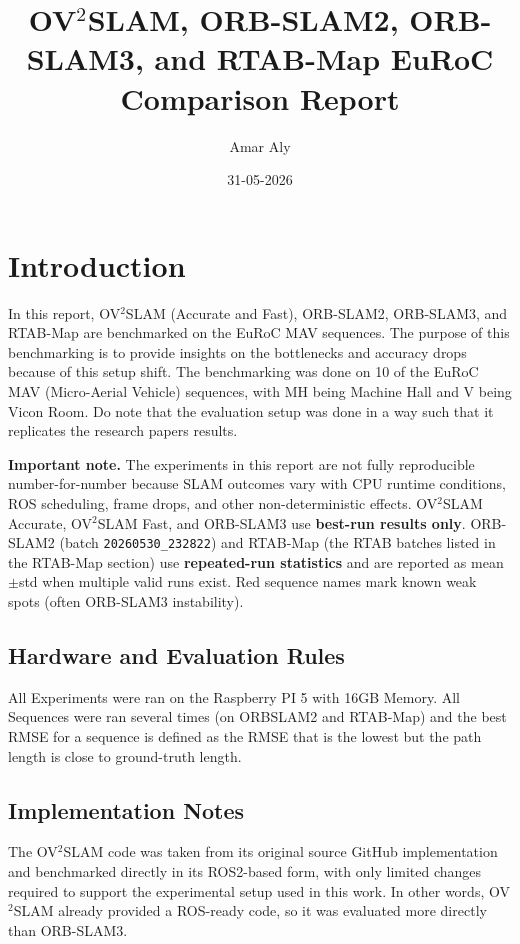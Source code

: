 \documentclass[11pt]{article}
\title{OV$^{2}$SLAM, ORB-SLAM2, ORB-SLAM3, and RTAB-Map EuRoC Comparison Report}
\author{Amar Aly}
\date{31-05-2026}
\begin{document}
\maketitle


\tableofcontents

\section{Introduction}

In this report, OV$^{2}$SLAM (Accurate and Fast), ORB-SLAM2, ORB-SLAM3, and RTAB-Map are benchmarked on the EuRoC MAV sequences. The purpose of this benchmarking is to provide insights on the bottlenecks and accuracy drops because of this setup shift. The benchmarking was done on 10 of the EuRoC MAV (Micro-Aerial Vehicle) sequences, with MH being Machine Hall and V being Vicon Room. Do note that the evaluation setup was done in a way such that it replicates the research papers results.

\textbf{Important note.} The experiments in this report are not fully reproducible number-for-number because SLAM outcomes vary with CPU runtime conditions, ROS scheduling, frame drops, and other non-deterministic effects. OV$^{2}$SLAM Accurate, OV$^{2}$SLAM Fast, and ORB-SLAM3 use \textbf{best-run results only}. ORB-SLAM2 (batch \texttt{20260530\_232822}) and RTAB-Map (the RTAB batches listed in the RTAB-Map section) use \textbf{repeated-run statistics} and are reported as mean$\pm$std when multiple valid runs exist. Red sequence names mark known weak spots (often ORB-SLAM3 instability).

\subsection{Hardware and Evaluation Rules}
All Experiments were ran on the Raspberry PI 5 with 16GB Memory. All Sequences were ran several times (on ORBSLAM2 and RTAB-Map) and the best RMSE for a sequence is defined as the RMSE that is the lowest but the path length is close to ground-truth length. 

\subsection{Implementation Notes}

The OV$^{2}$SLAM code was taken from its original source GitHub implementation and benchmarked directly in its ROS2-based form, with only limited changes required to support the experimental setup used in this work. In other words, OV$^{2}$SLAM already provided a ROS-ready code, so it was evaluated more directly than ORB-SLAM3.
\end{document}
